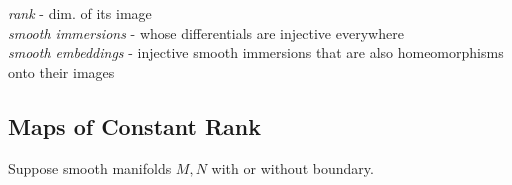 %                                               
%                                                              
%




\emph{rank} - dim. of its image \\

\emph{smooth immersions} - whose differentials are injective everywhere \\
\emph{smooth embeddings} - injective smooth immersions that are also homeomorphisms onto their images 

\subsection*{Maps of Constant Rank}

Suppose smooth manifolds $M,N$ with or without boundary.  


